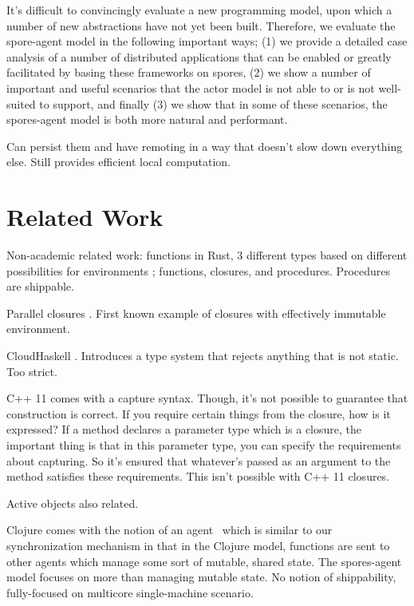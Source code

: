 \documentclass{llncs}
\begin{document}
It's difficult to convincingly evaluate a new programming model, upon which a number of new abstractions have not yet been built. Therefore, we evaluate the spore-agent model in the following important ways; (1) we provide a detailed case analysis of a number of distributed applications that can be enabled or greatly facilitated by basing these frameworks on spores, (2) we show a number of important and useful scenarios that the actor model is not able to or is not well-suited to support, and finally (3) we show that in some of these scenarios, the spores-agent model is both more natural and performant.

Can persist them and have remoting in a way that doesn't slow down everything else. Still provides efficient local computation.

\section{Related Work}

Non-academic related work: functions in Rust, 3 different types based on
different possibilities for environments \cite{RustFunctions}; functions,
closures, and procedures. Procedures are shippable.

Parallel closures \cite{ParallelClosures}. First known example of closures
with effectively immutable environment.

CloudHaskell \cite{CloudHaskell}. Introduces a type system that rejects anything
that is not static. Too strict.

C++ 11 comes with a capture syntax. Though, it's not possible to guarantee that construction is correct. If you require certain things from the closure, how is it expressed? If a method declares a parameter type which is a closure, the important thing is that in this parameter type, you can specify the requirements about capturing. So it's ensured that whatever's passed as an argument to the method satisfies these requirements. This isn't possible with C++ 11 closures. \cite{Cplusplus11Spec}

Active objects also related. \cite{ActiveObjects}

Clojure comes with the notion of an agent~\cite{Clojure} which is similar to our synchronization mechanism in that in the Clojure model, functions are sent to other agents which manage some sort of mutable, shared state. The spores-agent model focuses on more than managing mutable state. No notion of shippability, fully-focused on multicore single-machine scenario.



\end{document}
